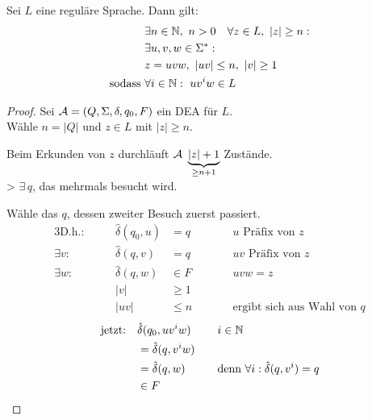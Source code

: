 \begin{lemma}\label{lem:pumping}
        Sei $L$ eine reguläre Sprache. Dann gilt:
        \begin{alignat*}{2}
                &\exists n\in\N,\ n>0\quad \forall z\in L,\ |z|\geq n:\\
                &\exists u,v,w\in\Sigma^* :\\
                &z = uvw,\ |uv| \leq n,\ |v| \geq 1\\
                \text{sodass }& \forall i\in\N:\ uv^iw\in L
        \end{alignat*}
\end{lemma}
\vspace{-1em}
\begin{proof}
	Sei $\mathcal{A}=(Q,\Sigma,\delta,q_0,F)$ ein \ac{DEA} für $L$.\\
	Wähle $n=|Q|$ und $z\in L$ mit $|z|\geq n$.
	
	Beim Erkunden von $z$ durchläuft $\mathcal{A}\ \underbrace{|z|+1}_{\geq n+1}$ Zustände.\\
	\-> $\exists\, q$, das mehrmals besucht wird.
	
	Wähle das $q$, dessen zweiter Besuch zuerst passiert.
	\begin{alignat*}{3}
		\text{D.h.}:&\quad& \hat\delta(q_0,u)&=q &\qquad& u\text{ Präfix von }z\\
		\exists v:&& \hat\delta(q,v)&=q && uv\text{ Präfix von }z\\
		\exists w:&& \hat\delta(q,w)&\in F && uvw=z\\
		&& |v| &\geq 1\\
		&& |uv| &\leq n && \text{ergibt sich aus Wahl von }q
	\end{alignat*}
	\begin{alignat*}{2}
		\text{jetzt:}\quad &\hat\delta(q_0,uv^iw) &\quad& i\in\mathbb{N}\\
		&= \hat\delta(q,v^iw)\\
		&= \hat\delta(q,w) && \text{denn }\forall i: \hat\delta(q,v^i)=q\\
		&\in F \tag*{\qedhere}
	\end{alignat*}
\end{proof}
%

